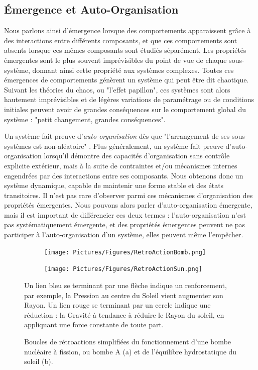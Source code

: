 			\subsection{Émergence et Auto-Organisation}
			
			Nous parlons ainsi d'émergence lorsque des comportements apparaissent grâce à des interactions entre différents composants, et que ces comportements sont absents lorsque ces mêmes composants sont étudiés séparément. Les propriétés émergentes sont le plus souvent imprévisibles du point de vue de chaque sous-système, donnant ainsi cette propriété aux systèmes complexes. Toutes ces émergences de comportements génèrent un système qui peut être dit chaotique. 
			Suivant les théories du chaos, ou "l'effet papillon", ces systèmes sont alors hautement imprévisibles et de légères variations de paramétrage ou de conditions initiales peuvent avoir de grandes conséquences sur le comportement global du système : "petit changement, grandes conséquences".
			
			Un système fait preuve d'\textit{auto-organisation} dès que "l'arrangement de ses sous-systèmes est non-aléatoire" \cite{goos_self-organisation_2003}. Plus généralement, un système fait preuve d'auto-organisation lorsqu'il démontre des capacités d'organisation sans contrôle explicite extérieur, mais à la suite de contraintes et/ou mécanismes internes engendrées par des interactions entre ses composants. Nous obtenons donc un système dynamique, capable de maintenir une forme stable et des états transitoires. Il n'est pas rare d'observer parmi ces mécanismes d'organisation des propriétés émergentes. Nous pouvons alors parler d'auto-organisation émergente, mais il est important de différencier ces deux termes : l'auto-organisation n'est pas systématiquement émergente, et des propriétés émergentes peuvent ne pas participer à l'auto-organisation d'un système, elles peuvent même l'empêcher.
			
			\begin{figure}
			\centering
			\begin{subfigure}{0.45\textwidth}
        		\centering
         		\texttt{[image: Pictures/Figures/RetroActionBomb.png]}
         		\caption{}
         		\label{bomb}
     		\end{subfigure}
     		\hfill
			\begin{subfigure}{0.45\textwidth}
        		\centering
         		\texttt{[image: Pictures/Figures/RetroActionSun.png]}
         		\caption{}
         		\label{sun}
     		\end{subfigure}
			\caption{Boucles de rétroactions simplifiées du fonctionnement d'une bombe nucléaire à fission, ou bombe A (a) et de l'équilibre hydrostatique du soleil (b).}{Un lien bleu se terminant par une flèche indique un renforcement, par exemple, la Pression au centre du Soleil vient augmenter son Rayon. Un lien rouge se terminant par un cercle indique une réduction : la Gravité à tendance à réduire le Rayon du soleil, en appliquant une force constante de toute part.}
			\label{RetroActions}
			\end{figure}
			

